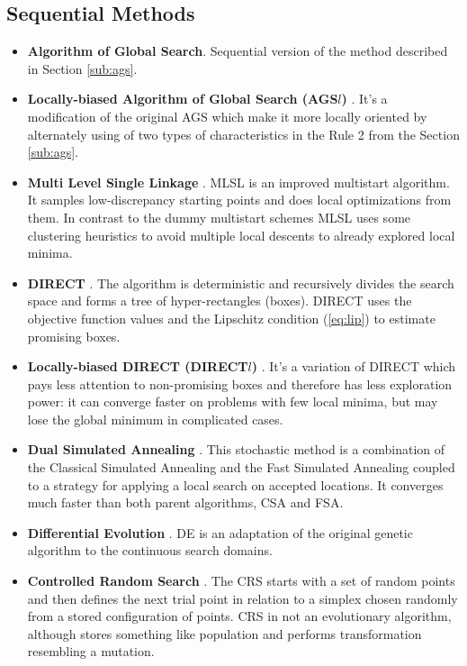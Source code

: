 \documentclass{svproc}
\begin{document}
\subsection{Sequential Methods}
\begin{itemize}
  \item \textbf{Algorithm of Global Search}. Sequential version of the method described in Section
\ref{sub:ags}.

  \item \textbf{Locally-biased Algorithm of Global Search (AGS\(l\))} \cite{indexMethod}. It's a
modification of
  the original AGS which make it more locally oriented by alternately using of two types of
characteristics in the Rule 2 from the Section \ref{sub:ags}.

  \item \textbf{Multi Level Single Linkage} \cite{Kan1987StochasticGO}. MLSL is an improved
multistart algorithm.
  It samples low-discrepancy starting points and does local optimizations from them. In contrast to
the dummy multistart schemes
  MLSL uses some clustering heuristics to avoid multiple local descents to already explored local
minima.

  \item \textbf{DIRECT} \cite{Jones2009}. The algorithm is deterministic and recursively divides
the search space and forms a tree of hyper-rectangles (boxes). DIRECT uses the objective function
values and the Lipschitz condition (\ref{eq:lip}) to estimate promising boxes.

  \item \textbf{Locally-biased DIRECT (DIRECT$l$)} \cite{Gablonsky2001}. It's a variation of
DIRECT which pays less attention to non-promising boxes and therefore
  has less exploration power: it can converge faster on problems with few local minima, but may lose the
global minimum in complicated cases.

  \item \textbf{Dual Simulated Annealing} \cite{XIANG1997216}. This stochastic method is a
combination of the Classical Simulated Annealing and the Fast Simulated Annealing coupled to a
strategy for applying a local search on accepted locations. It converges much faster than both parent
algorithms, CSA and FSA.

  \item \textbf{Differential Evolution} \cite{Storn1997}. DE is an adaptation of the original genetic
algorithm to
  the continuous search domains.

  \item \textbf{Controlled Random Search} \cite{Price1983}. The CRS starts with a set of random
points and then defines
  the next trial point in relation to a simplex chosen randomly from a stored configuration of points.
CRS in not an
  evolutionary algorithm, although stores something like population and performs transformation
resembling a mutation.


\end{itemize}
\end{document}

